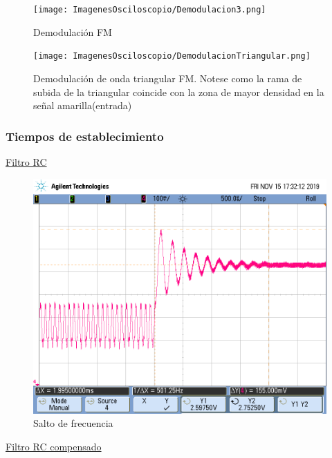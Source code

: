 \begin{figure}[H]
	\centering
	\texttt{[image: ImagenesOsciloscopio/Demodulacion3.png]}
	\caption{Demodulación FM}
	\label{freqdemod2}
\end{figure}


\begin{figure}[H]
	\centering
	\texttt{[image: ImagenesOsciloscopio/DemodulacionTriangular.png]}
	\caption{Demodulación de onda triangular FM. Notese como la rama de subida de la triangular coincide con la zona de mayor densidad en la señal amarilla(entrada)}
	\label{freqdemodtrian}
\end{figure}

\subsubsection{Tiempos de establecimiento}
\underline{Filtro RC}
\begin{figure}[H]
	\centering
	\includegraphics[scale=0.5]{ImagenesOsciloscopio/EscalonRCcomun.png}
	\caption{Salto de frecuencia}
	\label{jump1}
\end{figure}
\underline{Filtro RC compensado}
